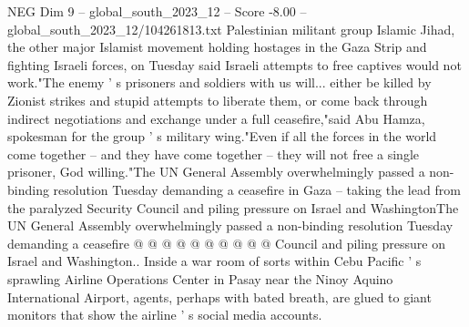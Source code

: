 \begin{textsample}{NEG Dim 9 – global\_south\_2023\_12 – Score -8.00 – global\_south\_2023\_12/104261813.txt}
Palestinian militant group Islamic Jihad, the other major Islamist movement holding hostages in the Gaza Strip and fighting Israeli forces, on Tuesday said Israeli attempts to free captives would not work."The enemy ' s prisoners and soldiers with us will... either be killed by Zionist strikes and stupid attempts to liberate them, or come back through indirect negotiations and exchange under a full ceasefire,"said Abu Hamza, spokesman for the group ' s military wing."Even if all the forces in the world come together -- and they have come together -- they will not free a single prisoner, God willing."The UN General Assembly overwhelmingly passed a non-binding resolution Tuesday demanding a ceasefire in Gaza -- taking the lead from the paralyzed Security Council and piling pressure on Israel and WashingtonThe UN General Assembly overwhelmingly passed a non-binding resolution Tuesday demanding a ceasefire @ @ @ @ @ @ @ @ @ @ Council and piling pressure on Israel and Washington..
Inside a war room of sorts within Cebu Pacific ' s sprawling Airline Operations Center in Pasay near the Ninoy Aquino International Airport, agents, perhaps with bated breath, are glued to giant monitors that show the airline ' s social media accounts.

\end{textsample}
